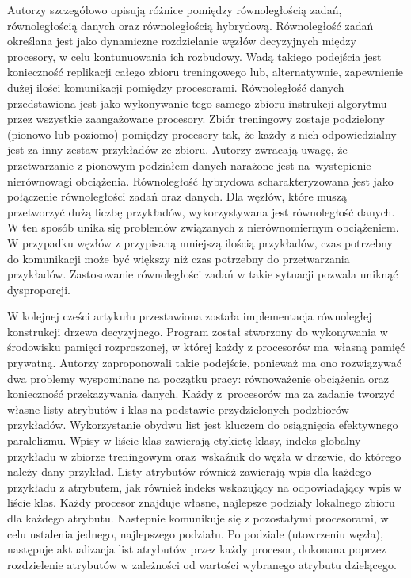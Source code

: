 \documentclass[12pt]{article}
\begin{document}
Autorzy szczegółowo opisują różnice pomiędzy równoległością zadań, równoległością danych oraz równoległością hybrydową. Równoległość zadań określana jest
jako dynamiczne rozdzielanie węzłów decyzyjnych między procesory, w celu kontunuowania ich rozbudowy. Wadą takiego podejścia jest konieczność replikacji całego zbioru
treningowego lub, alternatywnie, zapewnienie dużej ilości komunikacji pomiędzy procesorami. Równoległość danych przedstawiona jest jako wykonywanie tego samego zbioru instrukcji
algorytmu przez wszystkie zaangażowane procesory. Zbiór treningowy zostaje podzielony (pionowo lub poziomo) pomiędzy procesory tak, że każdy z nich odpowiedzialny jest za
inny zestaw przykładów ze zbioru. Autorzy zwracają uwagę, że przetwarzanie z pionowym podziałem danych narażone jest na~wystepienie nierównowagi obciążenia.
Równoległość hybrydowa scharakteryzowana jest jako połączenie równoległości zadań oraz danych. Dla węzłów, które muszą przetworzyć dużą liczbę przykładów, wykorzystywana
jest równoległość danych. W ten sposób unika się problemów związanych z nierównomiernym obciążeniem. W przypadku węzłów z przypisaną mniejszą ilością przykładów,
czas potrzebny do komunikacji może być większy niż czas potrzebny do przetwarzania przykładów. Zastosowanie równoległości zadań w takie sytuacji pozwala uniknąć dysproporcji.

W kolejnej cześci artykułu przestawiona została implementacja równoległej konstrukcji drzewa decyzyjnego. Program został stworzony do wykonywania w środowisku pamięci
rozproszonej, w której każdy z procesorów ma~własną pamięć prywatną. Autorzy zaproponowali takie podejście, ponieważ ma ono rozwiązywać dwa problemy wyspominane na
początku pracy: równoważenie obciążenia oraz konieczność przekazywania danych. Każdy z~procesorów ma za zadanie tworzyć własne listy atrybutów i klas na podstawie
przydzielonych podzbiorów przykładów. Wykorzystanie obydwu list jest kluczem do osiągnięcia efektywnego paralelizmu. Wpisy w liście klas zawierają etykietę klasy, indeks
globalny przykładu w zbiorze treningowym oraz~wskaźnik do węzła w drzewie, do którego należy dany przykład. Listy atrybutów również zawierają wpis dla każdego przykładu
z atrybutem, jak również indeks wskazujący na odpowiadający wpis w liście klas. Każdy procesor znajduje własne, najlepsze podziały lokalnego zbioru dla każdego atrybutu.
Nastepnie komunikuje się z pozostałymi procesorami, w celu ustalenia jednego, najlepszego podziału. Po podziale (utowrzeniu węzła), następuje aktualizacja list atrybutów
przez każdy procesor, dokonana poprzez rozdzielenie atrybutów w zależności od wartości wybranego atrybutu dzielącego.
\end{document}
